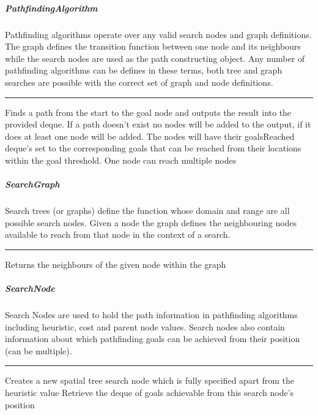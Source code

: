 \subparagraph{ PathfindingAlgorithm } Pathfinding algorithms operate over any valid search nodes and graph definitions. The graph defines the transition function between one node and its neighbours while the search nodes are used as 
 the path constructing object. Any number of pathfinding algorithms can be defines in these terms, both tree and graph searches are possible with the correct set of graph and node definitions.
 
\hrule
\begin{mitem}
\scriptsize
	{}
	{Finds a path from the start to the goal node and outputs the result into the provided deque.\newline%
 If a path doesn't exist no nodes will be added to the output, if it does at least one node will be added. The nodes will have their goalsReached deque's set\newline%
 to the corresponding goals that can be reached from their locations within the goal threshold. One node can reach multiple nodes}
\end{mitem}

\subparagraph{ SearchGraph } Search trees (or graphs) define the function whose domain and range are all possible search nodes. 
 Given a node the graph defines the neighbouring nodes available to reach from that node in the context of a search.
 
\hrule
\begin{mitem}
\scriptsize
	{Returns the neighbours of the given node within the graph}
\end{mitem}

\subparagraph{ SearchNode } Search Nodes are used to hold the path information in pathfinding algorithms including heuristic, cost and parent node values. Search nodes also contain information about which
 pathfinding goals can be achieved from their position (can be multiple).
 
\hrule
\begin{mitem}
\scriptsize
	{Creates a new spatial tree search node which is fully specified apart from\newline%
 the heuristic value}
	{Retrieve the deque of goals achievable from this search node's position}
\end{mitem}

